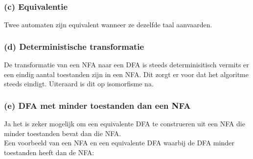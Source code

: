\subsubsection*{(c) Equivalentie}
Twee automaten zijn equivalent wanneer ze dezelfde taal aanvaarden. 
\subsubsection*{(d) Deterministische transformatie}
De transformatie van een NFA naar een DFA is steeds determinisitisch vermits er een eindig aantal toestanden zijn in een NFA. Dit zorgt er voor dat het algoritme steeds eindigt. Uiteraard is dit op isomorfisme na.
\subsubsection*{(e) DFA met minder toestanden dan een NFA}
Ja het is zeker mogelijk om een equivalente DFA te construeren uit een NFA die minder toestanden bevat dan die NFA. \\
Een voorbeeld van een NFA en een equivalente DFA waarbij de DFA minder toestanden heeft dan de NFA: 